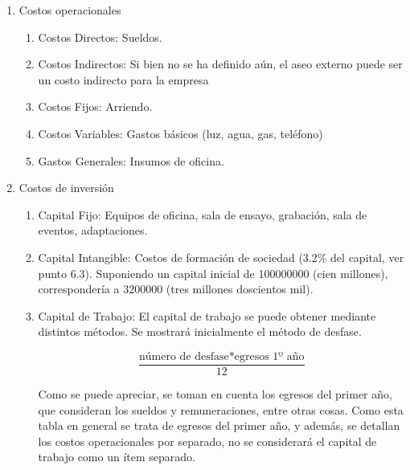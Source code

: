 \begin{enumerate}
	\item Costos operacionales
	\begin{enumerate}
		\item Costos Directos: Sueldos.
		\item Costos Indirectos: Si bien no se ha definido aún, el aseo externo puede ser un costo indirecto para la empresa
		\item Costos Fijos: Arriendo.
		\item Costos Variables: Gastos básicos (luz, agua, gas, teléfono)
		\item Gastos Generales: Insumos de oficina.
	\end{enumerate}

	\item Costos de inversión
	\begin{enumerate}
		\item Capital Fijo: Equipos de oficina, sala de ensayo, grabación, sala de eventos, adaptaciones.
		\item Capital Intangible: Costos de formación de sociedad (3.2\% del capital, ver punto 6.3). Suponiendo un capital 
		inicial de 100000000 (cien millones), correspondería a 3200000 (tres millones doscientos mil).
		\item Capital de Trabajo: El capital de trabajo se puede obtener mediante distintos métodos. Se mostrará inicialmente el método de desfase.

		$$
		\frac{\text{número de desfase}*\text{egresos 1º año}}{12}
		$$

		Como se puede apreciar, se toman en cuenta los egresos del primer año, que consideran los sueldos y remuneraciones, entre otras cosas. 
Como esta tabla en general se trata de egresos del primer año, y además, se detallan los costos operacionales por separado, no se considerará el capital de 
trabajo como un ítem separado.
\end{enumerate}
\end{enumerate}
